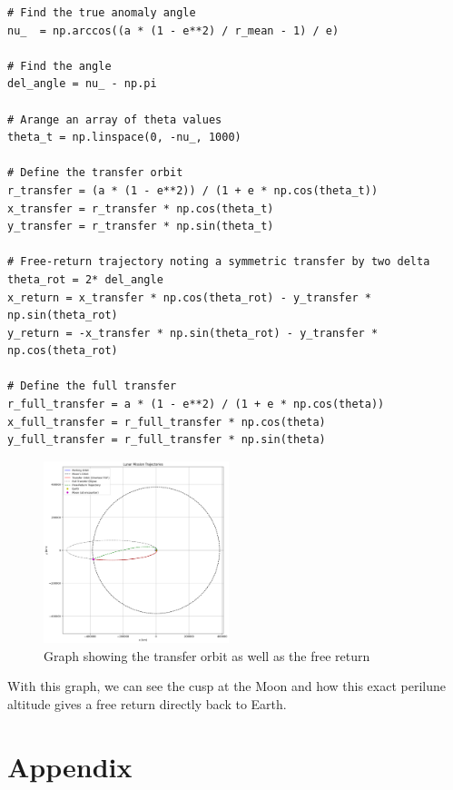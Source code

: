 \documentclass[12pt,twocolumn]{article}  %
\begin{document}
\begin{lstlisting}
# Find the true anomaly angle 
nu_  = np.arccos((a * (1 - e**2) / r_mean - 1) / e)

# Find the angle 
del_angle = nu_ - np.pi

# Arange an array of theta values
theta_t = np.linspace(0, -nu_, 1000)

# Define the transfer orbit
r_transfer = (a * (1 - e**2)) / (1 + e * np.cos(theta_t))
x_transfer = r_transfer * np.cos(theta_t)
y_transfer = r_transfer * np.sin(theta_t)

# Free-return trajectory noting a symmetric transfer by two delta
theta_rot = 2* del_angle
x_return = x_transfer * np.cos(theta_rot) - y_transfer * np.sin(theta_rot)
y_return = -x_transfer * np.sin(theta_rot) - y_transfer * np.cos(theta_rot)

# Define the full transfer 
r_full_transfer = a * (1 - e**2) / (1 + e * np.cos(theta))
x_full_transfer = r_full_transfer * np.cos(theta)
y_full_transfer = r_full_transfer * np.sin(theta)
    \end{lstlisting}

\begin{figure}[H]
    \centering
    \includegraphics[width=0.48\textwidth]{Images/bonus.png}
    \caption{Graph showing the transfer orbit as well as the free return}
\end{figure}

With this graph, we can see the cusp at the Moon and how this exact perilune altitude gives a free return 
directly back to Earth.





\onecolumn
\section{Appendix}
\end{document}
